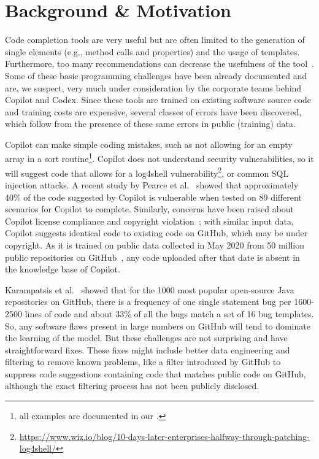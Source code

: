\section{Background \& Motivation}
\label{challenges}
Code completion tools are very useful but are often limited to the generation of single elements (e.g., method calls and properties) and the usage of templates. Furthermore, too many recommendations can decrease the usefulness of the tool~\cite{Proksch2015}. 
Some of these basic programming challenges have been already documented and are, we suspect, very much under consideration by the corporate teams behind Copilot and Codex. Since these tools are trained on existing software source code and training costs are expensive, several classes of errors have been discovered, which follow from the presence of these same errors in public (training) data.

Copilot can make simple coding mistakes, such as not allowing for an empty array in a sort routine\footnote{all examples are documented in our \repl{}.}. Copilot does not understand security vulnerabilities, so it will suggest code that allows for a \textsf{log4shell} vulnerability\footnote{\url{https://www.wiz.io/blog/10-days-later-enterprises-halfway-through-patching-log4shell/}}, or common SQL injection attacks. A recent study by Pearce et al.~\cite{copilot_security} showed that approximately 40\% of the code suggested by Copilot is vulnerable when tested on 89 different scenarios for Copilot to complete.
Similarly, concerns have been raised about Copilot license compliance and copyright violation~\cite{code_clone}; with similar input data, Copilot suggests identical code to existing code on GitHub, which may be under copyright. 
As it is trained on public data collected in May 2020 from 50 million public repositories on GitHub~\cite{copilot}, any code uploaded after that date is absent in the knowledge base of Copilot. 

Karampatsis et al.~\cite{github_bugs} showed that for the 1000 most popular open-source Java repositories on GitHub, there is a frequency of one single statement bug per 1600-2500 lines of code and about 33\% of all the bugs match a set of 16 bug templates. 
So, any software flaws present in large numbers on GitHub will tend to dominate the learning of the model.
But these challenges are not surprising and have straightforward fixes. These fixes might include better data engineering and filtering to remove known problems, like a filter introduced by GitHub to suppress code suggestions containing code that matches public code on GitHub, although the exact filtering process has not been publicly disclosed.

